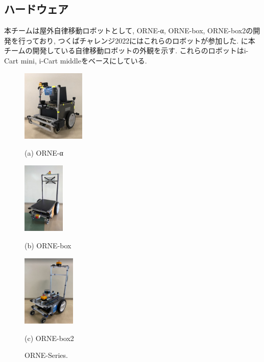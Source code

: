 \documentclass[uplatex, twocolumn, 9pt]{jsproceedings}
\begin{document}
\subsection{ハードウェア}
本チームは屋外自律移動ロボットとして, ORNE-α, ORNE-box, ORNE-box2の開発を行っており, つくばチャレンジ2022にはこれらのロボットが参加した. に本チームの開発している自律移動ロボットの外観を示す. これらのロボットはi-Cart mini, i-Cart middleをベースにしている.

\begin{figure}[h]
  \centering
  \begin{minipage}[b]{0.3\linewidth}
    \centering
    \includegraphics[width=30mm]{fig/alpha.pdf}
    \caption*{(a) ORNE-α}
  \end{minipage} 
  \hspace{0.03\columnwidth}
  \begin{minipage}[b]{0.3\linewidth}
    \centering
    \includegraphics[height=34mm]{fig/box.pdf}
    \caption*{(b) ORNE-box}
  \end{minipage}
  \begin{minipage}[b]{0.3\linewidth}
    \centering
    \includegraphics[height=34mm]{fig/box2.pdf}
    \caption*{(c) ORNE-box2}
  \end{minipage}
  \caption{ORNE-Series.}
  \label{fig:orne-series}%
\end{figure}
\end{document}
